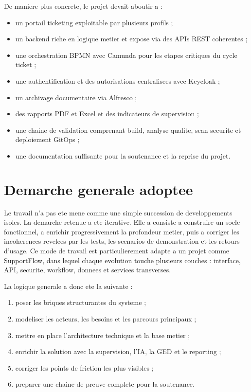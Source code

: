 De maniere plus concrete, le projet devait aboutir a :

\begin{itemize}[leftmargin=1.2cm]
  \item un portail ticketing exploitable par plusieurs profils ;
  \item un backend riche en logique metier et expose via des APIs REST coherentes ;
  \item une orchestration BPMN avec Camunda pour les etapes critiques du cycle ticket ;
  \item une authentification et des autorisations centralisees avec Keycloak ;
  \item un archivage documentaire via Alfresco ;
  \item des rapports PDF et Excel et des indicateurs de supervision ;
  \item une chaine de validation comprenant build, analyse qualite, scan securite et deploiement GitOps ;
  \item une documentation suffisante pour la soutenance et la reprise du projet.
\end{itemize}

\section{Demarche generale adoptee}

Le travail n'a pas ete mene comme une simple succession de developpements isoles. La demarche retenue a ete iterative. Elle a consiste a construire un socle fonctionnel, a enrichir progressivement la profondeur metier, puis a corriger les incoherences revelees par les tests, les scenarios de demonstration et les retours d'usage. Ce mode de travail est particulierement adapte a un projet comme SupportFlow, dans lequel chaque evolution touche plusieurs couches : interface, API, securite, workflow, donnees et services transverses.

La logique generale a donc ete la suivante :

\begin{enumerate}[leftmargin=1.2cm]
  \item poser les briques structurantes du systeme ;
  \item modeliser les acteurs, les besoins et les parcours principaux ;
  \item mettre en place l'architecture technique et la base metier ;
  \item enrichir la solution avec la supervision, l'IA, la GED et le reporting ;
  \item corriger les points de friction les plus visibles ;
  \item preparer une chaine de preuve complete pour la soutenance.
\end{enumerate}

